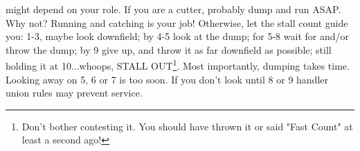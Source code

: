 \documentclass{tufte-handout}
\begin{document}
might depend on your role. 
If you are a cutter, 
probably dump 
and run ASAP. 
Why not? 
Running 
and catching  
is your job! 
Otherwise, 
let the stall count 
guide you:
1-3, maybe look downfield; 
by 4-5 look at the dump; 
for 5-8 wait for and/or throw the dump;
by 9 give up, and
throw it as far downfield as possible;
still holding it at 10...whoops, 
STALL OUT\footnote{
Don't bother 
contesting it. 
You should have thrown 
it or said "Fast Count" 
at least a second ago!}.
Most importantly, 
dumping takes time.
Looking away
on 5, 6 or 7 
is too soon.  
If you don't look 
until 8 or 9 
handler union rules 
may prevent service.





\end{document}
